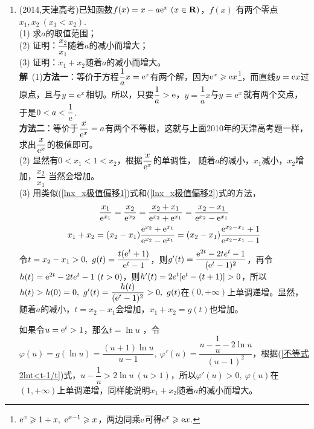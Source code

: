 \begin{enumerate}[label={【\textbf{例\thechapter.\arabic*}】},
 leftmargin=\inteval{\myenumleftmargin}pt,
 itemsep=\inteval{\myenumitempsep}pt,
 itemindent=\inteval{\myenumitemindent}pt]
\item (2014,天津高考)已知函数$ f(x)=x-a\e^{x}\ (x\in \textbf{R}) $，$ f(x) $
有两个零点$ x_1,x_2\ (x_1<x_2) $. \\
(1) 求$ a $的取值范围；\\
(2) 证明：$ \dfrac{x_2}{x_1} $随着$ a $的减小而增大；\\
(3) 证明：$ x_1+x_2 $随着$ a $的减小而增大。\\
\textbf{解}\ (1)\textbf{方法一}：等价于方程$ \dfrac{1}{a}x=\mathrm{e}^x $有两个解，因为$ \mathrm{e}^x\geqslant \mathrm{e} x $\footnote{\q $ \mathrm{e}^x\geqslant 1+x,\ \mathrm{e}^{x-1}\geqslant x $，两边同乘$ \mathrm{e} $可得$ \mathrm{e}^x\geqslant \mathrm{e} x $. }，而直线$ y=\mathrm{e} x $过原点，且与$ y=\mathrm{e}^x $相切。所以，只要$ \dfrac{1}{a}> \mathrm{e} $，$ y=\dfrac{1}{a}x $与$ y=\mathrm{e}^x $就有两个交点，于是$ 0<a<\dfrac{1}{\mathrm{e}} $. \\
\textbf{方法二}：等价于$ \dfrac{x}{\mathrm{e}^x}=a $有两个不等根，这就与上面2010年的天津高考题一样，求出$ \dfrac{x}{\mathrm{e}^x} $的极值即可。\\
(2) 显然有$ 0<x_1<1<x_2 $，根据$ \dfrac{x}{\mathrm{e}^x} $的单调性，
随着$ a $的减小，$ x_1 $减小，$ x_2 $增加，$ \dfrac{x_2}{x_1} $
当然会增加。\\
(3)  用类似(\ref{lnx_x极值偏移1})式和(\ref{lnx_x极值偏移2})式的方法，
\begin{gather*}
	\dfrac{x_1}{\mathrm{e}^{x_1}}=\dfrac{x_2}{\mathrm{e}^{x_2}}=
	\dfrac{x_2+x_1}{\mathrm{e}^{x_2}+\mathrm{e}^{x_1}}=
	\dfrac{x_2-x_1}{\mathrm{e}^{x_2}-\mathrm{e}^{x_1}} \\
	x_1+x_2=(x_2-x_1)\dfrac{\mathrm{e}^{x_2}+\mathrm{e}^{x_1}}{\mathrm{e}^{x_2}-\mathrm{e}^{x_1}} 
	=(x_2-x_1)\dfrac{\mathrm{e}^{x_2-x_1}+1}{\mathrm{e}^{x_2-x_1}-1}
\end{gather*}
令$ t=x_2-x_1>0,\ g(t)=\dfrac{t(\e^t+1)}{\e^t-1} $，则$ g'(t)=\dfrac{\mathrm{e}^{2t}-2te^t-1}{(\mathrm{e}^t-1)^2} $，再令$ h(t)=\mathrm{e}^{2t}-2te^t-1\ (t>0) $，则$ h'(t)=2e^t[\mathrm{e}^t-(t+1)]>0 $，所以$ h(t)>h(0)=0,\ g'(t)=\dfrac{h(t)}{(\e^t-1)^2}>0,\ g(t) $在$ (0,+\infty) $上单调递增。显然，随着$ a $的减小，$ t=x_2-x_1 $会增加，$ x_1+x_2=g(t) $也增加。

如果令$ u=\mathrm{e}^t>1 $，那么$ t=\ln u$ ，令$ \varphi(u)=g(\ln u)=\dfrac{(u+1)\ln u}{u-1},\ \varphi'(u)=\dfrac{u-\dfrac{1}{u}-2\ln u}{(u-1)^2} $，根据(\ref{不等式2lnt<t-1/t})式，$ u-\dfrac{1}{u}>2\ln u\ (u>1) $，所以$ \varphi'(u)>0,\ \varphi(u) $在$ (1,+\infty) $上单调递增，同样能说明$ x_1+x_2 $随着$ a $的减小而增大。


\end{enumerate}

